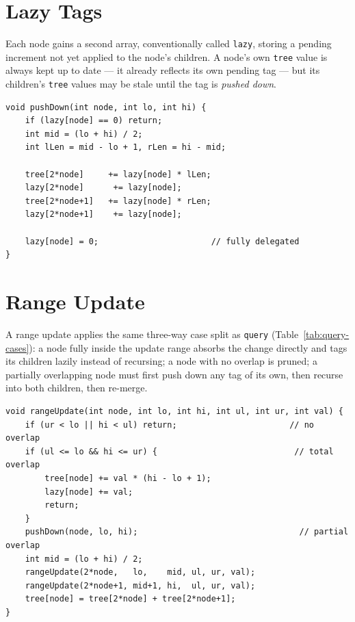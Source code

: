 \section{Lazy Tags}
Each node gains a second array, conventionally called \texttt{lazy}, storing a pending increment not yet applied to the node's children. A node's own \texttt{tree} value is always kept up to date --- it already reflects its own pending tag --- but its children's \texttt{tree} values may be stale until the tag is \emph{pushed down}.

\begin{lstlisting}[style=cpp, caption={Pushing a pending tag down to both children before recursing into either one.}, label={alg:pushdown}]
void pushDown(int node, int lo, int hi) {
    if (lazy[node] == 0) return;
    int mid = (lo + hi) / 2;
    int lLen = mid - lo + 1, rLen = hi - mid;

    tree[2*node]     += lazy[node] * lLen;
    lazy[2*node]      += lazy[node];
    tree[2*node+1]   += lazy[node] * rLen;
    lazy[2*node+1]    += lazy[node];

    lazy[node] = 0;                       // fully delegated
}
\end{lstlisting}

\section{Range Update}
A range update applies the same three-way case split as \texttt{query} (Table~\ref{tab:query-cases}): a node fully inside the update range absorbs the change directly and tags its children lazily instead of recursing; a node with no overlap is pruned; a partially overlapping node must first push down any tag of its own, then recurse into both children, then re-merge.

\begin{lstlisting}[style=cpp, caption={Range update with lazy propagation (add \texttt{val} to every element in $[ul,ur]$).}, label={alg:rangeupdate}]
void rangeUpdate(int node, int lo, int hi, int ul, int ur, int val) {
    if (ur < lo || hi < ul) return;                       // no overlap
    if (ul <= lo && hi <= ur) {                            // total overlap
        tree[node] += val * (hi - lo + 1);
        lazy[node] += val;
        return;
    }
    pushDown(node, lo, hi);                                 // partial overlap
    int mid = (lo + hi) / 2;
    rangeUpdate(2*node,   lo,    mid, ul, ur, val);
    rangeUpdate(2*node+1, mid+1, hi,  ul, ur, val);
    tree[node] = tree[2*node] + tree[2*node+1];
}
\end{lstlisting}

